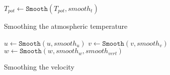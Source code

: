 \begin{algorithm}
    $T_{pot} \leftarrow \texttt{Smooth}(T_{pot}, smooth_t)$ \;
    \caption{Smoothing the atmospheric temperature}
    \label{alg:smootht}
\end{algorithm}

\begin{algorithm}
    $u \leftarrow \texttt{Smooth}(u, smooth_u)$ \;
    $v \leftarrow \texttt{Smooth}(v, smooth_v)$ \;
    $w \leftarrow \texttt{Smooth}(w, smooth_w, smooth_{vert})$ \;
    \caption{Smoothing the velocity}
    \label{alg:smoothv}
\end{algorithm}